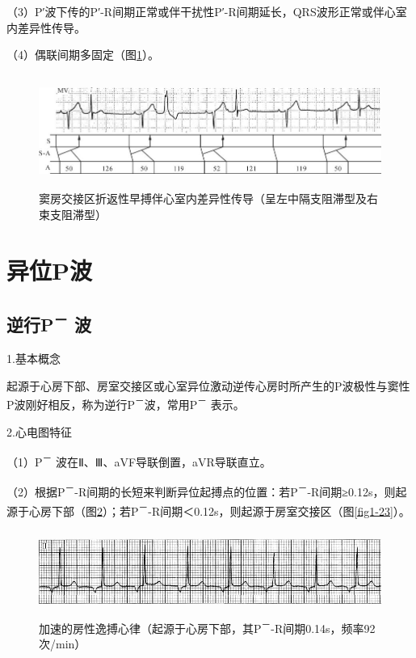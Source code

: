 （3）P′波下传的P′-R间期正常或伴干扰性P′-R间期延长，QRS波形正常或伴心室内差异性传导。

（4）偶联间期多固定（图\ref{fig1-21}）。

\begin{figure}[!htbp]
 \centering
 \includegraphics[width=5.79167in,height=1.45833in]{./images/Image00027.jpg}
 \captionsetup{justification=centering}
 \caption{窦房交接区折返性早搏伴心室内差异性传导（呈左中隔支阻滞型及右束支阻滞型）}
 \label{fig1-21}
  \end{figure} 

\protect\hypertarget{text00007.htmlux5cux23subid19}{}{}

\section{异位P波}

\protect\hypertarget{text00007.htmlux5cux23subid20}{}{}

\subsection{逆行P\textsuperscript{－} 波}

1.基本概念

起源于心房下部、房室交接区或心室异位激动逆传心房时所产生的P波极性与窦性P波刚好相反，称为逆行P\textsuperscript{－}波，常用P\textsuperscript{－} 表示。

2.心电图特征

（1）P\textsuperscript{－} 波在Ⅱ、Ⅲ、aVF导联倒置，aVR导联直立。

（2）根据P\textsuperscript{－}-R间期的长短来判断异位起搏点的位置：若P\textsuperscript{－}-R间期≥0.12s，则起源于心房下部（图\ref{fig1-22}）；若P\textsuperscript{－}-R间期＜0.12s，则起源于房室交接区（图\ref{fig1-23}）。

\begin{figure}[!htbp]
 \centering
 \includegraphics[width=5.58333in,height=1.07292in]{./images/Image00028.jpg}
 \captionsetup{justification=centering}
 \caption{加速的房性逸搏心律（起源于心房下部，其P\textsuperscript{－}-R间期0.14s，频率92次/min）}
 \label{fig1-22}
  \end{figure} 


